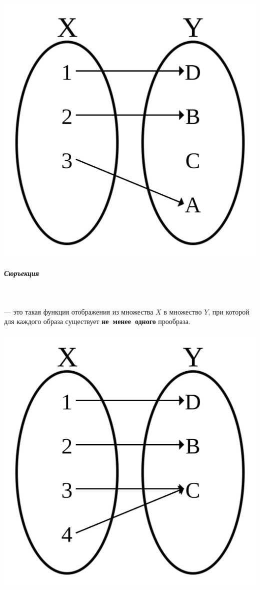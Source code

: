 \documentclass[12pt, a4]{article}
\begin{document}
\begin{minipage}{0.3\textwidth}
	\includegraphics[scale=0.075]{injectia}
\end{minipage}
\subparagraph{Сюръекция}\mbox{}\\
\begin{minipage}{0.1\textwidth}
\end{minipage}
\hspace{0.5cm}
\begin{minipage}{0.6\textwidth}
	--- это такая функция отображения из множества $X$ в множество $Y$, при которой для каждого образа существует \textbf{не~менее~одного} прообраза.
\end{minipage}
\hfill
\begin{minipage}{0.3\textwidth}
	\includegraphics[scale=0.075]{surjectia}
\end{minipage}
\end{document}
